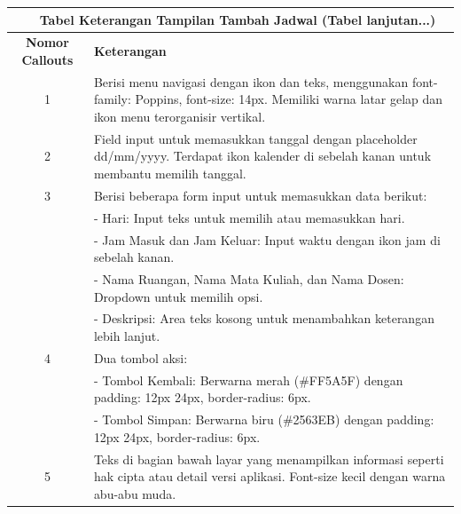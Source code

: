 \begin{enumerate}
{\begin{longtable}{c p{}}
		      \multicolumn{2}{c}{\small\tablename\ \thetable\ {Tabel Keterangan Tampilan Tambah Jadwal} \space (Tabel lanjutan...)}                                                                   \\
		      \hline
		      \textbf{Nomor Callouts} & \textbf{Keterangan}                                                                                                                                           \\
		      \hline
		      \endhead

		      1                       & Berisi menu navigasi dengan ikon dan teks, menggunakan font-family: Poppins, font-size: 14px. Memiliki warna latar gelap dan ikon menu terorganisir vertikal. \\
		      2                       & Field input untuk memasukkan tanggal dengan placeholder dd/mm/yyyy. Terdapat ikon kalender di sebelah kanan untuk membantu memilih tanggal.                   \\
		      3                       & Berisi beberapa form input untuk memasukkan data berikut:                                                                                                     \\
		                              & - Hari: Input teks untuk memilih atau memasukkan hari.                                                                                                        \\
		                              & - Jam Masuk dan Jam Keluar: Input waktu dengan ikon jam di sebelah kanan.                                                                                     \\
		                              & - Nama Ruangan, Nama Mata Kuliah, dan Nama Dosen: Dropdown untuk memilih opsi.                                                                                \\
		                              & - Deskripsi: Area teks kosong untuk menambahkan keterangan lebih lanjut.                                                                                      \\
		      4                       & Dua tombol aksi:                                                                                                                                              \\
		                              & - Tombol Kembali: Berwarna merah (\#FF5A5F) dengan padding: 12px 24px, border-radius: 6px.                                                                    \\
		                              & - Tombol Simpan: Berwarna biru (\#2563EB) dengan padding: 12px 24px, border-radius: 6px.                                                                      \\
		      5                       & Teks di bagian bawah layar yang menampilkan informasi seperti hak cipta atau detail versi aplikasi. Font-size kecil dengan warna abu-abu muda.                \\
		      \hline
	      \end{longtable}
	      }


\end{enumerate}

